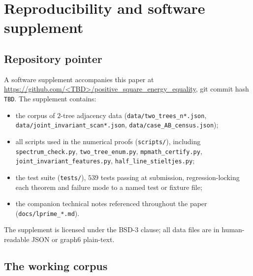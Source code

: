 \section{Reproducibility and software supplement}\label{app:reproducibility}

\subsection{Repository pointer}\label{app:repro:repo}

A software supplement accompanies this paper at
\url{https://github.com/<TBD>/positive_square_energy_equality}, git
commit hash \texttt{TBD}. The supplement contains:
\begin{itemize}
\item the corpus of $2$-tree adjacency data
(\texttt{data/two\_trees\_n*.json},
\texttt{data/joint\_invariant\_scan*.json},
\texttt{data/case\_AB\_census.json});
\item all scripts used in the numerical proofs (\texttt{scripts/}),
including \texttt{spectrum\_check.py}, \texttt{two\_tree\_enum.py},
\texttt{mpmath\_certify.py}, \texttt{joint\_invariant\_features.py},
\texttt{half\_line\_stieltjes.py};
\item the test suite (\texttt{tests/}), $539$ tests passing at
submission, regression-locking each theorem and failure mode to a
named test or fixture file;
\item the companion technical notes referenced throughout the paper
(\texttt{docs/lprime\_*.md}).
\end{itemize}
The supplement is licensed under the BSD-3 clause; all data files are
in human-readable JSON or graph6 plain-text.

\subsection{The working corpus}\label{app:repro:corpus}


